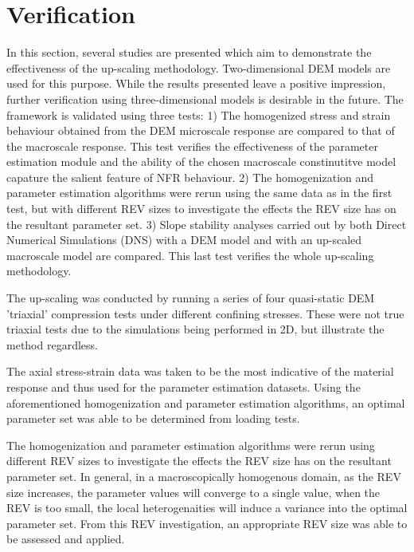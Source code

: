 \section{Verification}

In this section, several studies are presented which aim to demonstrate the effectiveness of the up-scaling methodology. Two-dimensional DEM models are used for this purpose. While the results presented leave a positive impression, further verification using three-dimensional models is desirable in the future. The framework is validated using three tests: 1) The homogenized stress and strain behaviour obtained from the DEM microscale response are compared to that of the macroscale response. This test verifies the effectiveness of the parameter estimation module and the ability of the chosen macroscale constinutitve model capature the salient feature of NFR behaviour. 2) The homogenization and parameter estimation algorithms were rerun using the same data as in the first test, but with different REV sizes to investigate the effects the REV size has on the resultant parameter set. 3) Slope stability analyses carried out by both Direct Numerical Simulations (DNS) with a DEM model and with an up-scaled macroscale model are compared. This last test verifies the whole up-scaling methodology.

 The up-scaling was conducted by running a series of four quasi-static DEM 'triaxial' compression tests under different confining stresses. These were not true triaxial tests due to the simulations being performed in 2D, but illustrate the method regardless.

The axial stress-strain data was taken to be the most indicative of the material response and thus used for the parameter estimation datasets. Using the aforementioned homogenization and parameter estimation algorithms, an optimal parameter set was able to be determined from loading tests.

The homogenization and parameter estimation algorithms were rerun using different REV sizes to investigate the effects the REV size has on the resultant parameter set. In general, in a macroscopically homogenous domain, as the REV size increases, the parameter values will converge to a single value, when the REV is too small, the local heterogenaities will induce a variance into the optimal parameter set. From this REV investigation, an appropriate REV size was able to be assessed and applied. 

